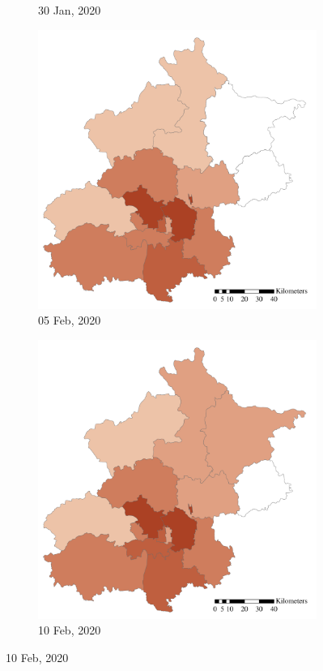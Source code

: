 \documentclass[ijgi,submit,moreauthors,pdftex]{Definitions/mdpi}
\begin{document}
\begin{figure}[ht]
\begin{subfigure}{.23\textwidth}
        \caption{30 Jan, 2020}
    \end{subfigure}
    \begin{subfigure}{.23\textwidth}
        \includegraphics[width=\textwidth]{Figures/ConfirmedDistrictD2020_02_05-eps-converted-to.pdf}
        \caption{05 Feb, 2020}
    \end{subfigure}
    \begin{subfigure}{.23\textwidth}
        \includegraphics[width=\textwidth]{Figures/ConfirmedDistrictD2020_02_10-eps-converted-to.pdf}
        \caption{10 Feb, 2020}
    \end{subfigure}


\end{figure}
\end{document}
